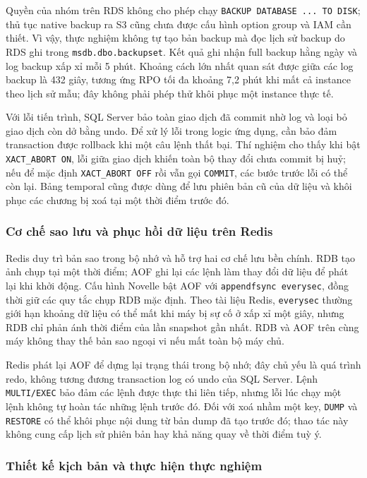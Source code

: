 Quyền của nhóm trên RDS không cho phép chạy \texttt{BACKUP DATABASE ... TO DISK}; thủ tục native backup ra S3 cũng chưa được cấu hình option group và IAM cần thiết. Vì vậy, thực nghiệm không tự tạo bản backup mà đọc lịch sử backup do RDS ghi trong \texttt{msdb.dbo.backupset}. Kết quả ghi nhận full backup hằng ngày và log backup xấp xỉ mỗi 5 phút. Khoảng cách lớn nhất quan sát được giữa các log backup là 432 giây, tương ứng RPO tối đa khoảng 7,2 phút khi mất cả instance theo lịch sử mẫu; đây không phải phép thử khôi phục một instance thực tế.

Với lỗi tiến trình, SQL Server bảo toàn giao dịch đã commit nhờ log và loại bỏ giao dịch còn dở bằng undo. Để xử lý lỗi trong logic ứng dụng, cần bảo đảm transaction được rollback khi một câu lệnh thất bại. Thí nghiệm cho thấy khi bật \texttt{XACT\_ABORT ON}, lỗi giữa giao dịch khiến toàn bộ thay đổi chưa commit bị huỷ; nếu để mặc định \texttt{XACT\_ABORT OFF} rồi vẫn gọi \texttt{COMMIT}, các bước trước lỗi có thể còn lại. Bảng temporal cũng được dùng để lưu phiên bản cũ của dữ liệu và khôi phục các chương bị xoá tại một thời điểm trước đó.

\subsubsection{Cơ chế sao lưu và phục hồi dữ liệu trên Redis}

Redis duy trì bản sao trong bộ nhớ và hỗ trợ hai cơ chế lưu bền chính. RDB tạo ảnh chụp tại một thời điểm; AOF ghi lại các lệnh làm thay đổi dữ liệu để phát lại khi khởi động. Cấu hình Novelle bật AOF với \texttt{appendfsync everysec}, đồng thời giữ các quy tắc chụp RDB mặc định. Theo tài liệu Redis, \texttt{everysec} thường giới hạn khoảng dữ liệu có thể mất khi máy bị sự cố ở xấp xỉ một giây, nhưng RDB chỉ phản ánh thời điểm của lần snapshot gần nhất. RDB và AOF trên cùng máy không thay thế bản sao ngoại vi nếu mất toàn bộ máy chủ.

Redis phát lại AOF để dựng lại trạng thái trong bộ nhớ; đây chủ yếu là quá trình redo, không tương đương transaction log có undo của SQL Server. Lệnh \texttt{MULTI/EXEC} bảo đảm các lệnh được thực thi liên tiếp, nhưng lỗi lúc chạy một lệnh không tự hoàn tác những lệnh trước đó. Đối với xoá nhầm một key, \texttt{DUMP} và \texttt{RESTORE} có thể khôi phục nội dung từ bản dump đã tạo trước đó; thao tác này không cung cấp lịch sử phiên bản hay khả năng quay về thời điểm tuỳ ý.

\subsubsection{Thiết kế kịch bản và thực hiện thực nghiệm}

